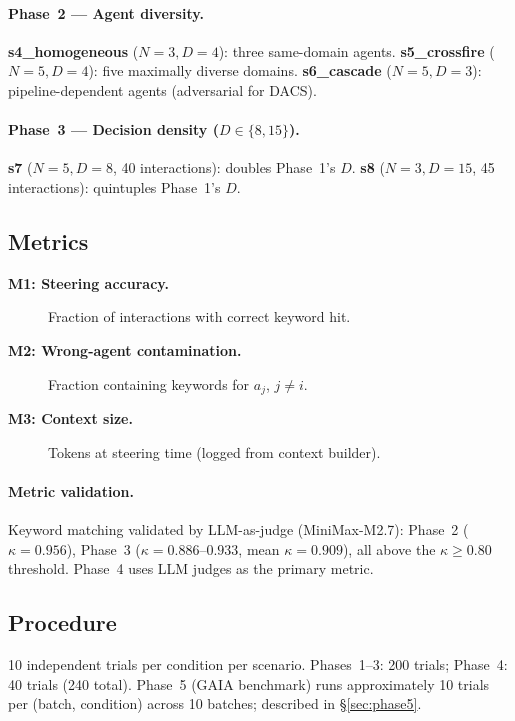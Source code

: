 \documentclass{article}
\begin{document}
\paragraph{Phase~2 --- Agent diversity.}
\textbf{s4\_homogeneous} ($N{=}3, D{=}4$): three same-domain agents.
\textbf{s5\_crossfire} ($N{=}5, D{=}4$): five maximally diverse domains.
\textbf{s6\_cascade} ($N{=}5, D{=}3$): pipeline-dependent agents
(adversarial for DACS).

\paragraph{Phase~3 --- Decision density ($D{\in}\{8,15\}$).}
\textbf{s7} ($N{=}5, D{=}8$, 40 interactions): doubles Phase~1's $D$.
\textbf{s8} ($N{=}3, D{=}15$, 45 interactions): quintuples Phase~1's $D$.

\subsection{Metrics}
\label{sec:metrics}

\begin{description}
  \item[\textbf{M1: Steering accuracy.}] Fraction of interactions with
  correct keyword hit.
  \item[\textbf{M2: Wrong-agent contamination.}] Fraction containing
  keywords for $a_j$, $j \neq i$.
  \item[\textbf{M3: Context size.}] Tokens at steering time (logged from
  context builder).
\end{description}

\paragraph{Metric validation.}
Keyword matching validated by LLM-as-judge (MiniMax-M2.7):
Phase~2 ($\kappa{=}0.956$), Phase~3 ($\kappa{=}0.886$--$0.933$, mean
$\kappa{=}0.909$), all above the $\kappa{\geq}0.80$ threshold.
Phase~4 uses LLM judges as the primary metric.

\subsection{Procedure}
\label{sec:procedure}

10 independent trials per condition per scenario.
Phases~1--3: 200 trials; Phase~4: 40 trials (240 total).
Phase~5 (GAIA benchmark) runs approximately 10 trials per
(batch, condition) across 10 batches; described in \S\ref{sec:phase5}.
\end{document}
